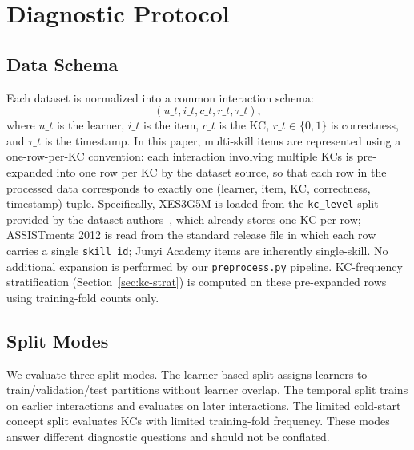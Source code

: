 \section{Diagnostic Protocol}
\label{sec:protocol}

\subsection{Data Schema}
Each dataset is normalized into a common interaction schema:
\begin{equation}
(u\_t, i\_t, c\_t, r\_t, \tau\_t),
\end{equation}
where $u\_t$ is the learner, $i\_t$ is the item, $c\_t$ is the KC, $r\_t\in\{0,1\}$ is correctness, and $\tau\_t$ is the timestamp.
In this paper, multi-skill items are represented using a one-row-per-KC convention: each interaction involving multiple KCs is pre-expanded into one row per KC by the dataset source, so that each row in the processed data corresponds to exactly one (learner, item, KC, correctness, timestamp) tuple. Specifically, XES3G5M is loaded from the \texttt{kc\_level} split provided by the dataset authors~\cite{liu2023xes3g5m}, which already stores one KC per row; ASSISTments 2012 is read from the standard release file in which each row carries a single \texttt{skill\_id}; Junyi Academy items are inherently single-skill. No additional expansion is performed by our \texttt{preprocess.py} pipeline. KC-frequency stratification (Section~\ref{sec:kc-strat}) is computed on these pre-expanded rows using training-fold counts only.

\subsection{Split Modes}
We evaluate three split modes. The learner-based split assigns learners to train/validation/test partitions without learner overlap. The temporal split trains on earlier interactions and evaluates on later interactions. The limited cold-start concept split evaluates KCs with limited training-fold frequency. These modes answer different diagnostic questions and should not be conflated.


